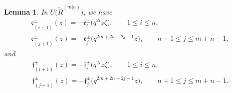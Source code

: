 \documentclass[pdftex]{sigma}
\numberwithin{equation}{section}
\newtheorem{Lemma}[Theorem]{Lemma}
\begin{document}
\begin{Lemma}\label{le4}In
$U\bigl(\widetilde{R}^{(m|n)}\bigr)$, we have
\begin{gather}\label{For5}
 \mathfrak{e}^{\pm}_{\overline{(i+1)}}(z)=-\mathfrak{e}^{\pm}_{i}\bigl(q^{2i}z\zeta\bigr), \qquad 1\leq i\leq n,\\
 \label{For6}
 \mathfrak{e}^{\pm}_{\overline{(j+1)}}(z)=-\mathfrak{e}^{\pm}_{j}\bigl(q^{2m+2n-2j-1}z\bigr), \qquad n+1\leq j\leq m+n-1,
\end{gather}
and
\begin{gather}\label{For7}
 \mathfrak{f}^{\pm}_{\overline{(i+1)}}(z)=-\mathfrak{f}^{\pm}_{i}\bigl(q^{2i}z\zeta\bigr), \qquad 1\leq i\leq n,\\
 \label{For8}
 \mathfrak{f}^{\pm}_{\overline{(j+1)}}(z)=-\mathfrak{f}^{\pm}_{j}\bigl(q^{2m+2n-2j-1}z\bigr), \qquad n+1\leq j\leq m+n-1.
\end{gather}
\end{Lemma}
\end{document}
